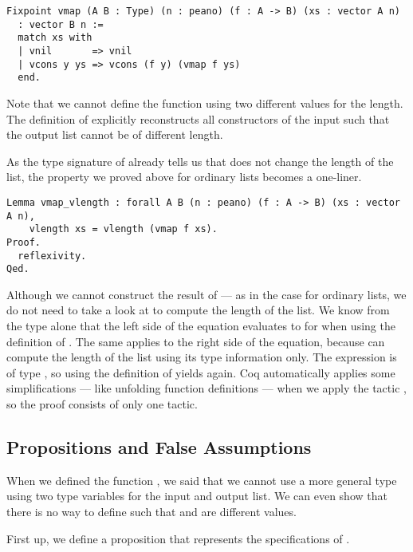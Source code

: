 \begin{verbatim}
Fixpoint vmap (A B : Type) (n : peano) (f : A -> B) (xs : vector A n)
  : vector B n :=
  match xs with
  | vnil       => vnil
  | vcons y ys => vcons (f y) (vmap f ys)
  end.
\end{verbatim}

Note that we cannot define the function using two different values for the length.
The definition of  explicitly reconstructs all constructors of the input  such that the output list cannot be of different length.

As the type signature of  already tells us that  does not change the length of the list, the property we proved above for ordinary lists becomes a one-liner.

\begin{verbatim}
Lemma vmap_vlength : forall A B (n : peano) (f : A -> B) (xs : vector A n),
    vlength xs = vlength (vmap f xs).
Proof.
  reflexivity.
Qed.
\end{verbatim}

Although we cannot construct the result of  --- as in the case for ordinary lists, we do not need to take a look at  to compute the length of the list.
We know from the type alone that the left side of the equation evaluates to  for  when using the definition of .
The same applies to the right side of the equation, because  can compute the length of the list using its type information only.
The expression  is of type , so using the definition of  yields  again.
Coq automatically applies some simplifications --- like unfolding function definitions --- when we apply the tactic , so the proof consists of only one tactic.

\subsection{Propositions and False Assumptions}

When we defined the function , we said that we cannot use a more general type using two type variables  for the input and output list.
We can even show that there is no way to define  such that  and  are different values.

First up, we define a proposition  that represents the specifications of .

